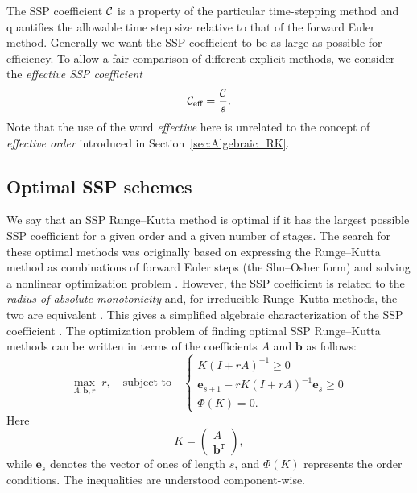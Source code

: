 The SSP coefficient $\mathcal{C}$ is a property of the particular
time-stepping method and quantifies the allowable time step size relative 
to that of the forward Euler method.
Generally we want the SSP coefficient to be as large as possible for efficiency.
To allow a fair comparison of different explicit methods, we consider the 
\emph{effective SSP coefficient}
\begin{align*}
	\mathcal{C}_{\text{eff}} = \frac{\mathcal{C}}{s}.
\end{align*}
Note that the use of the word \emph{effective} here is unrelated to the 
concept of \emph{effective order} introduced in Section~\ref{sec:Algebraic_RK}.

\subsection{Optimal SSP schemes}\label{subsec:Optimal_SSPRK}
We say that an SSP Runge--Kutta method is optimal if it has the largest 
possible SSP coefficient for a given order and a given number of stages.
The search for these optimal methods was originally based on
expressing the Runge--Kutta method as combinations of forward Euler
steps (the Shu--Osher form) and solving a nonlinear optimization
problem \cite{Gottlieb/Shu:1998, Gottlieb2001, Spiteri2003a, Spiteri2003b, 
Ruuth2004, Ruuth:2006}.
However, the SSP coefficient is related to the 
\emph{radius of absolute monotonicity} \cite{Kraaijevanger1991} and, 
for irreducible Runge--Kutta methods, the two are equivalent 
\cite{Ferracina2004, Higueras2004}.
This gives a simplified algebraic characterization of the SSP coefficient
\cite{Ferracina2005}.
The optimization problem of finding optimal SSP Runge--Kutta methods
can be written in terms of the coefficients $A$ and $\bm{b}$ as
follows:
\begin{equation}\label{eq:SSP_opt}
    \max_{A, \bm{b}, r} \; r, \quad \text{subject to} \quad \left\{
                                                 \begin{array}{ll}
                                                   K(I + rA)^{-1} \geq 0 \\
                                                   \bm{e}_{s+1} - rK(I + rA)^{-1}\bm{e}_{s} \geq 0 \\
                                                   \Phi(K) = 0.
                                                 \end{array}
                                               \right.
\end{equation}
Here
\begin{equation*}
    K = \left(
            \begin{array}{c}
                     A              \\
                     \bm{b}^{\texttt{T}}
            \end{array}
         \right),
\end{equation*}
while $\bm{e}_s$ denotes the vector of ones of length $s$,
and \( \Phi(K) \) represents the  order conditions.
The inequalities are understood component-wise.

